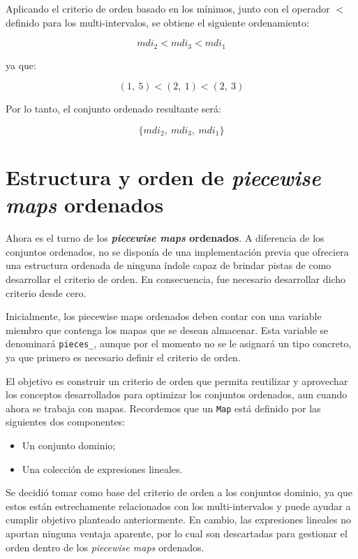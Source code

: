 Aplicando el criterio de orden basado en los mínimos, junto con el operador $<$ definido para los multi-intervalos, se obtiene el siguiente ordenamiento:

\begin{center}
\[
mdi_2 < mdi_3 < mdi_1
\]

ya que:

\[
(1,\ 5) < (2,\ 1) < (2,\ 3)
\]

Por lo tanto, el conjunto ordenado resultante será:

\[
\{mdi_2,\ mdi_3,\ mdi_1\}
\]
\end{center}


\section{Estructura y orden de \textit{piecewise maps} ordenados}

Ahora es el turno de los \textbf{\textit{piecewise maps} ordenados}. A diferencia de los conjuntos ordenados, no se disponía de una implementación previa que ofreciera una estructura ordenada de ninguna índole capaz de brindar pistas de como desarrollar el criterio de orden. En consecuencia, fue necesario desarrollar dicho criterio desde cero.

Inicialmente, los piecewise maps ordenados deben contar con una variable miembro que contenga los mapas que se desean almacenar. Esta variable se denominará \texttt{pieces\_}, aunque por el momento no se le asignará un tipo concreto, ya que primero es necesario definir el criterio de orden.

El objetivo es construir un criterio de orden que permita reutilizar y aprovechar los conceptos desarrollados para optimizar los conjuntos ordenados, aun cuando ahora se trabaja con mapas. Recordemos que un \texttt{Map} está definido por las siguientes dos componentes:

\begin{itemize}
  \item Un conjunto dominio;
  \item Una colección de expresiones lineales.
\end{itemize}

Se decidió tomar como base del criterio de orden a los conjuntos dominio, ya que estos están estrechamente relacionados con los multi-intervalos y puede ayudar a cumplir objetivo planteado anteriormente. En cambio, las expresiones lineales no aportan ninguna ventaja aparente, por lo cual son descartadas para gestionar el orden dentro de los \textit{piecewise maps} ordenados.

